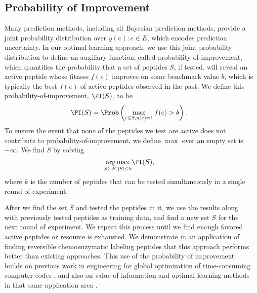 \subsection{Probability of Improvement} \label{sec:prob improvement} 
Many prediction methods, including all Bayesian prediction methods, provide a joint probability distribution over $y(e): e \in E$, which encodes prediction uncertainty. In our optimal learning approach, we use this joint probability distribution to define an auxiliary function, called probability of improvement, which quantifies the probability that a set of peptides $S$, if tested, will reveal an active peptide whose fitness $f(e)$ improves on some benchmark value $b$, which is typically the best $f(e)$ of active peptides observed in the past. We define this probability-of-improvement, $\PI(S)$, to be
\begin{equation}
  \PI(S) = \Prob \left( \max_{e \in S, y(e)=1} f(e) > b \right).
  \label{}
\end{equation}
To ensure the event that none of the peptides we test are active does not contribute to probability-of-improvement, we define $\max$ over an empty set is $-\infty$. We find $S$ by solving
\begin{equation}
  \underset{S \subseteq E, |S| \leq k}{\arg\max} \PI(S),
  \label{eq:opt PI}
\end{equation}
where $k$ is the number of peptides that can be tested simultaneously in a single round of experiment. 

After we find the set $S$ and tested the peptides in it, we use the results along with previously tested peptides as training data, and find a new set $S$ for the next round of experiment. We repeat this process until we find enough favored active peptides or resource is exhausted. We demonstrate in an application of finding reversible chemoenzymatic labeling peptides that this approach performs better than existing approaches. This use of the probability of improvement builds on previous work in engineering for global optimization of time-consuming computer codes \citep{kushner1964new, jones1998efficient}, and also on value-of-information and optimal learning methods in that same application area \citep{villemonteix2009informational, frazier2009knowledge}.


